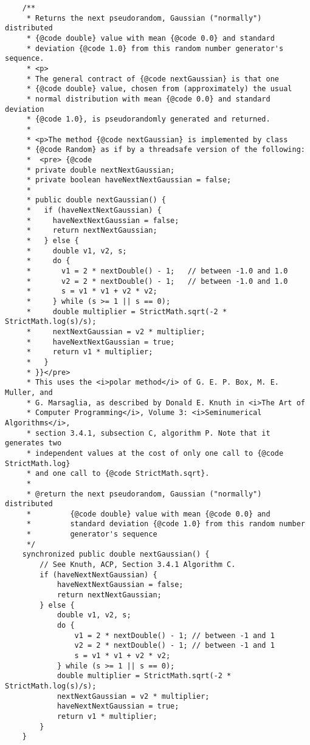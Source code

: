 \documentclass[12pt,a4paper,twoside,openright,titlepage,final]{article}
\begin{document}
\begin{verbatim}
    /**
     * Returns the next pseudorandom, Gaussian ("normally") distributed
     * {@code double} value with mean {@code 0.0} and standard
     * deviation {@code 1.0} from this random number generator's sequence.
     * <p>
     * The general contract of {@code nextGaussian} is that one
     * {@code double} value, chosen from (approximately) the usual
     * normal distribution with mean {@code 0.0} and standard deviation
     * {@code 1.0}, is pseudorandomly generated and returned.
     *
     * <p>The method {@code nextGaussian} is implemented by class
     * {@code Random} as if by a threadsafe version of the following:
     *  <pre> {@code
     * private double nextNextGaussian;
     * private boolean haveNextNextGaussian = false;
     *
     * public double nextGaussian() {
     *   if (haveNextNextGaussian) {
     *     haveNextNextGaussian = false;
     *     return nextNextGaussian;
     *   } else {
     *     double v1, v2, s;
     *     do {
     *       v1 = 2 * nextDouble() - 1;   // between -1.0 and 1.0
     *       v2 = 2 * nextDouble() - 1;   // between -1.0 and 1.0
     *       s = v1 * v1 + v2 * v2;
     *     } while (s >= 1 || s == 0);
     *     double multiplier = StrictMath.sqrt(-2 * StrictMath.log(s)/s);
     *     nextNextGaussian = v2 * multiplier;
     *     haveNextNextGaussian = true;
     *     return v1 * multiplier;
     *   }
     * }}</pre>
     * This uses the <i>polar method</i> of G. E. P. Box, M. E. Muller, and
     * G. Marsaglia, as described by Donald E. Knuth in <i>The Art of
     * Computer Programming</i>, Volume 3: <i>Seminumerical Algorithms</i>,
     * section 3.4.1, subsection C, algorithm P. Note that it generates two
     * independent values at the cost of only one call to {@code StrictMath.log}
     * and one call to {@code StrictMath.sqrt}.
     *
     * @return the next pseudorandom, Gaussian ("normally") distributed
     *         {@code double} value with mean {@code 0.0} and
     *         standard deviation {@code 1.0} from this random number
     *         generator's sequence
     */
    synchronized public double nextGaussian() {
        // See Knuth, ACP, Section 3.4.1 Algorithm C.
        if (haveNextNextGaussian) {
            haveNextNextGaussian = false;
            return nextNextGaussian;
        } else {
            double v1, v2, s;
            do {
                v1 = 2 * nextDouble() - 1; // between -1 and 1
                v2 = 2 * nextDouble() - 1; // between -1 and 1
                s = v1 * v1 + v2 * v2;
            } while (s >= 1 || s == 0);
            double multiplier = StrictMath.sqrt(-2 * StrictMath.log(s)/s);
            nextNextGaussian = v2 * multiplier;
            haveNextNextGaussian = true;
            return v1 * multiplier;
        }
    }


\end{verbatim}
\end{document}
